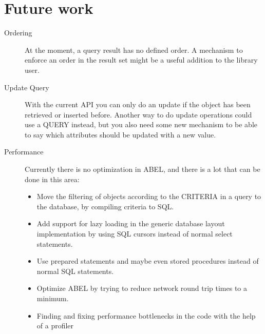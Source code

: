 \section{Future work}
\begin{description}
 \item [Ordering] At the moment, a query result has no defined order. A mechanism to enforce an order in the result set might be a useful addition to the library user.
 \item [Update Query] With the current API you can only do an update if the object has been retrieved or inserted before. 
Another way to do update operations could use a QUERY instead, but you also need some new mechanism to be able to say which attributes should be updated with a new value.
 \item [Performance] Currently there is no optimization in ABEL, and there is a lot that can be done in this area:
 \begin{itemize}
  \item Move the filtering of objects according to the CRITERIA in a query to the database, by compiling criteria to SQL.
 \item Add support for lazy loading in the generic database layout implementation by using SQL cursors instead of normal select statements.
 \item Use prepared statements and maybe even stored procedures instead of normal SQL statements.
 \item Optimize ABEL by trying to reduce network round trip times to a minimum.
 \item Finding and fixing performance bottlenecks in the code with the help of a profiler
\end{itemize}


\end{description}
